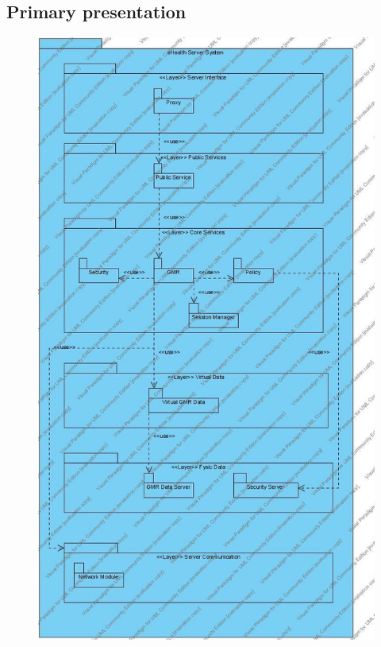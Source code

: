 \documentclass[a4paper,10pt]{article}
\begin{document}
\subsection{Primary presentation}
\begin{center}
    \begin{figure}[h!]
      \includegraphics[height=\textheight]{../images/UsesView_Server.jpg}
    \end{figure}
  \end{center}
\end{document}
